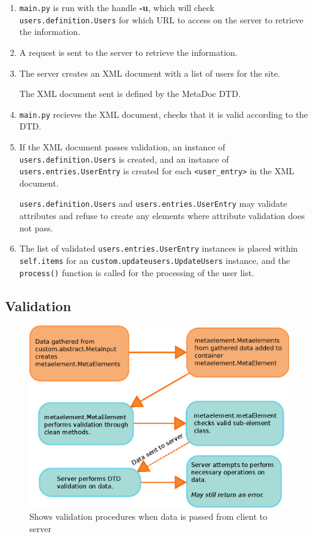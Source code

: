 \begin{enumerate}
    \item
        \texttt{main.py} is run with the handle \textbf{-u}, which will check
        \texttt{users.definition.Users} for which URL to access on the server
        to retrieve the information.
    \item
        A request is sent to the server to retrieve the information.
    \item
        The server creates an XML document with a list of users for the site.
        
        The XML document sent is defined by the MetaDoc DTD.
    \item
        \texttt{main.py} recieves the XML document, checks that it is valid
        according to the DTD. 
    \item
        If the XML document passes validation, an instance of
        \texttt{users.definition.Users} is created, and an instance of
        \texttt{users.entries.UserEntry} is created for each
        \texttt{<user\_entry>} in the XML document.

        \texttt{users.definition.Users} and \texttt{users.entries.UserEntry}
        may validate attributes and refuse to create any elements where
        attribute validation does not pass.
    \item
        The list of validated \texttt{users.entries.UserEntry} instances is
        placed within \texttt{self.items} for an
        \texttt{custom.updateusers.UpdateUsers} instance, and the
        \texttt{process()} function is called for the processing of the user
        list.
\end{enumerate}

\subsection{Validation}

\begin{figure}[h!]
    \includegraphics[width=\textwidth]{img/site_information_flow}
    \caption{Shows validation procedures when data is passed from client to
    server}
    \label{fig:site_information_flow}
\end{figure}

